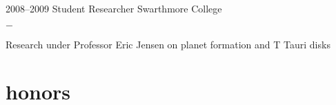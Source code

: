 \documentclass[]{luger-cv} %
\begin{document}
\begin{entrylist}

    \entry
    {2008--2009}
    {Student Researcher}
    {Swarthmore College}
    {%
        \vspace{-1em}
        \begin{list}{{\color{numcolor}$-$}}{\cvlist}
            \item Research under Professor Eric Jensen on planet formation and T Tauri disks
        \end{list}
    }


\end{entrylist}




\section{honors}
\end{document}
